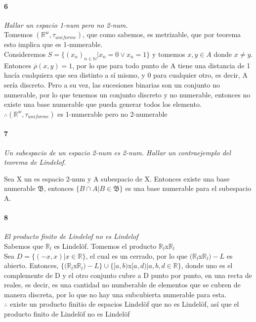 \documentclass[12pt]{article}
\begin{document}
\paragraph{6}
\textit{Hallar un espacio 1-num pero no 2-num.}
\\Tomemos $(\mathbb{R}^w,\tau_{uniforme})$, que como sabemos, es metrizable, que por teorema esto implica que es 1-numerable.
\\Consideremos $S=\{ (x_n)_{n\in \mathbb{N}}|x_n=0\lor x_n=1 \}$ y tomemos $x,y\in A$ donde $x\not =y$. Entonces $\overline{\rho}(x,y)=1$, por lo que para todo punto de A tiene una distancia de 1 hacía cualquiera que sea distinto a sí mismo, y 0 para cualquier otro, es decir, A sería discreto. Pero a su vez, las sucesiones binarias son un conjunto no numerable, por lo que tenemos un conjunto discreto y no numerable, entonces no existe una base numerable que pueda generar todos los elemento.
\\$\therefore (\mathbb{R}^w,\tau_{uniforme})$ es 1-numerable pero no 2-numerable
\paragraph{7}
\textit{Un subespacio de un espacio 2-num es 2-num. Hallar un contraejemplo del teorema de Lindelof.}

Sea X un es espacio 2-num y A subespacio de X. Entonces existe una base numerable $\mathfrak{B}$, entonces $\{B\cap A | B\in\mathfrak{B}\}$ es una base numerable para el subespacio A.
\paragraph{8}
\textit{El producto finito de Lindelof no es Lindelof}
\\Sabemos que $\mathbb{R}_l$ es Lindelöf. Tomemos el producto $\mathbb{R}_l$x$\mathbb{R}_l$
\\Sea $D=\{(-x,x)|x\in \mathbb{R}\}$, el cual es un cerrado, por lo que $(\mathbb{R}_l$x$\mathbb{R}_l) -L$ es abierto. Entonces, $\{(\mathbb{R}_l$x$\mathbb{R}_l) -L\}\cup\{ [a,b)$x$[a,d)|a,b,d\in \mathbb{R}\}$, donde uno es el complemente de D y el otro conjunto cubre a D punto por punto, en una recta de reales, es decir, es una cantidad no numberable de elementos que se cubren de manera discreta, por lo que no hay una subcubierta numerable para esta. 
\\$\therefore$ existe un producto finitio de espacios Lindelöf que no es Lindelöf, así que el producto finito de Lindelöf no es Lindelöf
\end{document}
